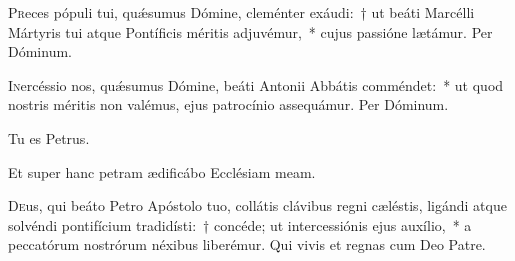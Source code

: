 \documentclass[vesperale_romanum.tex]{subfiles}
\begin{document}
\commsequentis

\myrule

\newpage
{}

\semiduplex


\oratio

\lettrine{P}{r}eces pópuli tui, quǽsumus Dómine, cleménter exáudi:~† ut beáti Marcélli Mártyris tui atque Pontíficis méritis adjuvémur,~* cujus passióne lætámur.
Per Dóminum.

\vespsequentiscomm

\myrule


\duplex

\oratio

\lettrine{I}{n}ercéssio nos, quǽsumus Dómine, beáti Antonii Abbátis comméndet:~* ut quod nostris méritis non valémus, ejus patrocínio assequámur.
Per Dóminum.



\myrule





\label{vv_tu_es_petrus}
 \vv Tu es Petrus.

\rr Et super hanc petram ædificábo Ecclésiam meam.


\oratio
\label{oratio_festo_cathedrae_s_petri}
\lettrine{D}{e}us, qui beáto Petro Apóstolo tuo, collátis clávibus regni cæléstis, ligándi atque solvéndi pontifícium tradidísti:~† concéde; ut intercessiónis ejus auxílio,~* a peccatórum nostrórum néxibus liberémur. Qui vivis et regnas cum Deo Patre.
\end{document}
